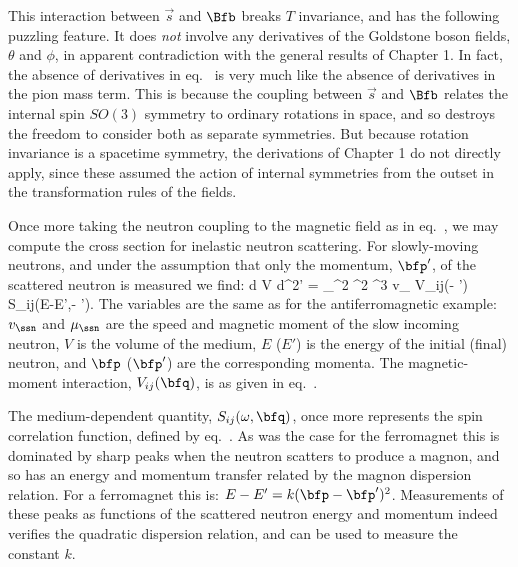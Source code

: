 \documentclass[12pt]{report}
\begin{document}
This interaction between $\vec s$ and $\Bfb$ breaks $T$
invariance, and has the following puzzling feature. It does
{\em not} involve any derivatives of the Goldstone boson
fields, 
$\theta$ and $\phi$, in apparent contradiction with the
general results of Chapter 1. In fact, the absence of
derivatives in 
eq.~ is very much like the
absence of derivatives in the pion mass term. This is
because the coupling between $\vec s$ and $\Bfb$ relates
the internal spin $SO(3)$ symmetry to ordinary rotations in
space, and so destroys the freedom to consider both as
separate symmetries. But because rotation invariance is a
spacetime symmetry, the derivations of Chapter 1 do not
directly apply, since these assumed the action of internal
symmetries from the outset in the transformation rules of
the fields.

Once more taking the neutron coupling to the magnetic field
as in eq.~, we may compute the cross
section for inelastic neutron scattering. For slowly-moving
neutrons, and under the assumption that only the momentum,
$\bfp'$, of the scattered neutron is measured we find:
%
\eq
\label{ferrocrosssection}
{d \sigma \over V d^2\bfp'} = 
{\mu_\ssn^2 \mu^2  \pi^3 v_\ssn} \;
V_{ij}(\bfp - \bfp') \; S_{ij}(E-E',\bfp - \bfp').  \eeq
%
The variables are the same as for the antiferromagnetic
example: $v_\ssn$ and $\mu_\ssn$ are the speed and magnetic
moment of the slow incoming neutron, $V$ is the volume of
the medium, $E$ ($E'$) is the energy of the initial (final)
neutron, and $\bfp$ 
($\bfp'$) are the corresponding momenta. The
magnetic-moment interaction, $V_{ij}(\bfq)$, is as given in 
eq.~.

The medium-dependent quantity, $S_{ij}(\omega,\bfq)$, once
more represents the spin correlation function, defined by 
eq.~. As was the case for the ferromagnet
this is dominated by sharp peaks when the neutron scatters
to produce a magnon, and so has an energy and momentum
transfer related by the magnon dispersion relation. For a
ferromagnet this is: $E - E' = k (\bfp - \bfp')^2$.
Measurements of these peaks as functions of the scattered
neutron energy and momentum indeed verifies the quadratic
dispersion relation, and can be used to measure the
constant $k$.
\end{document}
